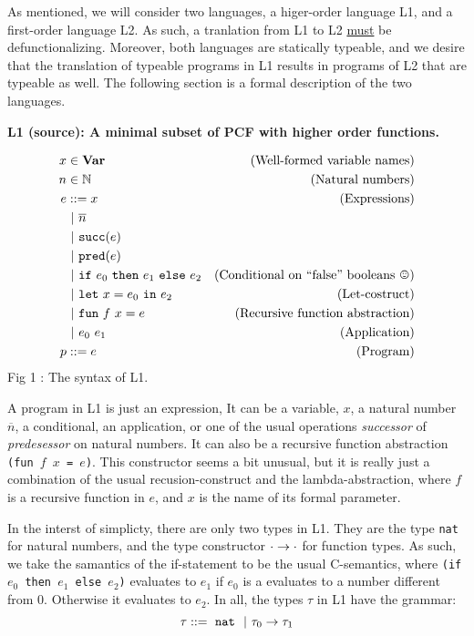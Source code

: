 As mentioned, we will consider two languages, a higer-order language L1,
and a first-order language L2.
As such, a tranlation from L1 to L2 \underline{must} be defunctionalizing.
Moreover, both languages are statically typeable,
and we desire that the translation of typeable programs in L1
results in programs of L2 that are typeable as well.
The following section is a formal description of the two languages.

{\bf L1 (source): A minimal subset of PCF with higher order functions.}
\vspace{-1.1cm}
\begin{center}
\begin{align*}
x &\in \Var                      &\text{(Well-formed variable names)}\\
n &\in \N                        &\text{(Natural numbers)}\\
e &::= x                         &\text{(Expressions)}\\
  &\OR \overline n\\
  &\OR \LIT{succ}(e)\\
  &\OR \LIT{pred}(e)\\
  &\OR \IF{e_0}{e_1}{e_2}             &\text{(Conditional on ``false'' booleans \smiley{})}\\
  &\OR \LIT{let}\ x = e_0 \SLIT{in} e_2 &\text{(Let-costruct)}\\
  &\OR \LIT{fun}\ f\ x = e              &\text{(Recursive function abstraction)}\\
  &\OR e_0\ e_1                         &\text{(Application)}\\
p &::= e                               &\text{(Program)}
\end{align*}
        Fig 1 : The syntax of L1.
\end{center}
A program in L1 is just an expression,
It can be a variable, $x$, a natural number $\overline n$,
a conditional, an application,
or one of the usual operations {\it {successor}} of
{\it {predesessor}} on natural numbers.
It can also be a recursive function abstraction {\tt (fun $f$ $x$ = $e$)}.
This constructor seems a bit unusual, but it is really just a combination of
the usual recusion-construct and the lambda-abstraction,
where $f$ is a recursive function in $e$, and $x$ is the name of its formal parameter.

In the interst of simplicty, there are only two types in L1.
They are the type {\tt nat} for natural numbers,
and the type constructor {$\cdot \rightarrow \cdot$} for function types.
As such, we take the samantics of the if-statement
to be the usual C-semantics, where {\tt (if $e_0$ then $e_1$ else $e_2$)}
evaluates to $e_1$ if $e_0$ is a evaluates to a number different from $0$.
Otherwise it evaluates to $e_2$. In all, the types $\tau$ in L1 have the grammar:
\[ \tau ::= \ \text{\tt nat}\  \ |\  \tau_0 \rightarrow \tau_1 \]


